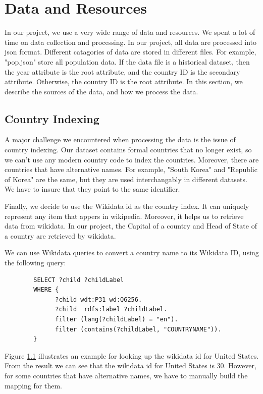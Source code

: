 \documentclass[12pt, fullpage,letterpaper]{article}
\begin{document}
\section{Data and Resources}
In our project, we use a very wide range of data and resources. We spent a lot of time on data collection and processing.
    In our project, all data are processed into json format. Different catagories
    of data are stored in different files. For example, "pop.json" store all population data.
    If the data file is a historical dataset, then the year attribute is the root attribute, and the country ID is the secondary attribute.
    Otherwise, the country ID is the root attribute.
In this section, we describe the sources of the data, and how we process the data.
\subsection{Country Indexing}
    A major challenge we encountered when processing the data is the issue of country indexing. Our dataset contains 
    formal countries that no longer exist, so we can't use any modern country code to index the countries.
    Moreover, there are countries that have alternative names. For example, "South Korea" and "Republic of Korea" are the same,
    but they are used interchangably in different datasets.
    We have to insure that they point to the same identifier.

    Finally, we decide to use the Wikidata id as the country index. It can uniquely represent any item that appers in wikipedia.
    Moreover, it helps us to retrieve data from wikidata. In our project, the Capital of a country and Head of State of a country are retrieved by wikidata.

    We can use Wikidata queries to convert a country name to its Wikidata ID, using the following query:

        \begin{verbatim}
        SELECT ?child ?childLabel
        WHERE {
              ?child wdt:P31 wd:Q6256.
              ?child  rdfs:label ?childLabel.
              filter (lang(?childLabel) = "en").
              filter (contains(?childLabel, "COUNTRYNAME")).
        }
        \end{verbatim}

        Figure \ref{} illustrates an example for looking up the wikidata id for United States. From the result we can see that the wikidata id for United States is 30.
        However, for some countries that have alternative names, we have to manually build the mapping for them.
\end{document}
